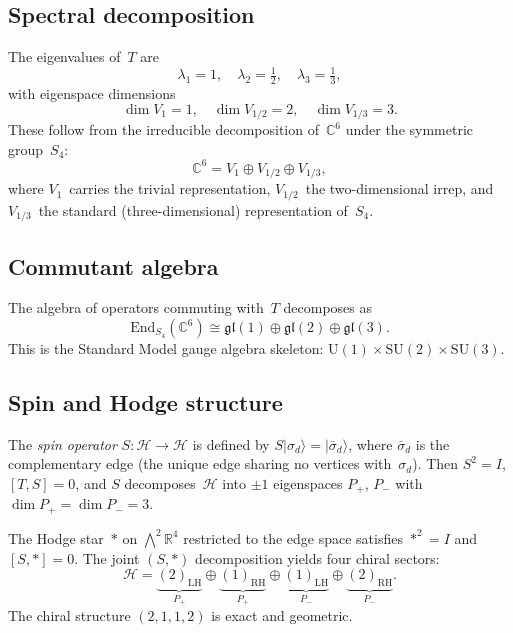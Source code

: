 \documentclass[%
 aip,
 amsmath,amssymb,
 reprint,%
]{revtex4-1}
\newcommand{\half}{\tfrac{1}{2}}
\newcommand{\third}{\tfrac{1}{3}}
\newcommand{\CC}{\mathbb{C}}
\newcommand{\RR}{\mathbb{R}}
\newcommand{\HH}{\mathcal{H}}
\newcommand{\Vone}{V_1}
\newcommand{\Vhalf}{V_{1/2}}
\newcommand{\Vthird}{V_{1/3}}
\newcommand{\Pp}{P_+}
\newcommand{\Pm}{P_-}
\begin{document}
\subsection{\label{ssec:spectrum}Spectral decomposition}

The eigenvalues of~$T$ are
\begin{equation}\label{eq:eigenvalues}
\lambda_1=1,\quad \lambda_2=\half,\quad \lambda_3=\third,
\end{equation}
with eigenspace dimensions
\begin{equation}\label{eq:dimensions}
\dim\Vone=1,\quad \dim\Vhalf=2,\quad \dim\Vthird=3.
\end{equation}
These follow from the irreducible decomposition of~$\CC^6$ under the symmetric group~$S_4$:
\begin{equation}\label{eq:decomposition}
\CC^6 = \Vone\oplus\Vhalf\oplus\Vthird,
\end{equation}
where $\Vone$~carries the trivial representation, $\Vhalf$~the two-dimensional irrep, and $\Vthird$~the standard (three-dimensional) representation of~$S_4$.

\subsection{\label{ssec:commutant}Commutant algebra}

The algebra of operators commuting with~$T$ decomposes as
\begin{equation}\label{eq:commutant}
\mathrm{End}_{S_4}(\CC^6)\cong\mathfrak{gl}(1)\oplus\mathfrak{gl}(2)\oplus\mathfrak{gl}(3).
\end{equation}
This is the Standard Model gauge algebra skeleton: $\mathrm{U}(1)\times\mathrm{SU}(2)\times\mathrm{SU}(3)$.

\subsection{\label{ssec:hodge}Spin and Hodge structure}

The \emph{spin operator} $S:\HH\to\HH$ is defined by $S|\sigma_d\rangle=|\bar{\sigma}_d\rangle$, where $\bar{\sigma}_d$ is the complementary edge (the unique edge sharing no vertices with~$\sigma_d$). Then $S^2=I$, $[T,S]=0$, and $S$ decomposes~$\HH$ into $\pm1$ eigenspaces $\Pp$, $\Pm$ with $\dim\Pp=\dim\Pm=3$.

The Hodge star~$*$ on $\bigwedge^2\RR^4$ restricted to the edge space satisfies $*^2=I$ and $[S,*]=0$. The joint $(S,*)$ decomposition yields four chiral sectors:
\begin{equation}\label{eq:chirality}
\HH=\underbrace{(2)_\mathrm{LH}}_{\Pp}\oplus\underbrace{(1)_\mathrm{RH}}_{\Pp}\oplus\underbrace{(1)_\mathrm{LH}}_{\Pm}\oplus\underbrace{(2)_\mathrm{RH}}_{\Pm}.
\end{equation}
The chiral structure $(2,1,1,2)$ is exact and geometric.
\end{document}
